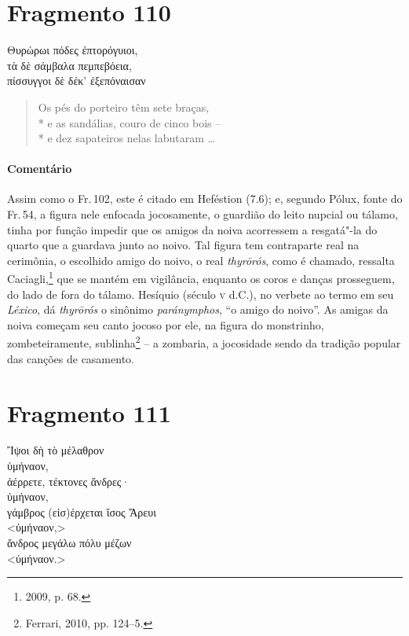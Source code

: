 {\section{Fragmento 110}

\begin{gkverse}
Θυρώρωι πόδες ἐπτορόγυιοι,\\
τὰ δὲ σάμβαλα πεμπεβόεια,\\
πίσσυγγοι δὲ δέκ’ ἐξεπόναισαν
\end{gkverse}

\begin{verse}
Os pés do porteiro têm sete braças,\\*
e as sandálias, couro de cinco bois -- \\*
e dez sapateiros nelas labutaram \ldots{}
\end{verse}

\medskip

{\paragraph{Comentário} Assim como o Fr.\,102, este é citado em Heféstion (7.6); e, segundo Pólux, fonte do Fr.\,54, a figura nele enfocada jocosamente, o guardião do leito nupcial ou tálamo, 
tinha por função impedir que os amigos da noiva acorressem a resgatá"-la do
quarto que a guardava junto ao noivo.
Tal figura tem contraparte real na cerimônia, o escolhido amigo do noivo, o real \textit{thyrōrós}, como é chamado, ressalta Caciagli,\footnote{2009, p. 68.} que se mantém em vigilância, enquanto os coros e danças prosseguem, do lado de fora do tálamo. Hesíquio (século \textsc{v} d.C.), no verbete ao termo em seu \textit{Léxico}, dá \textit{thyrōrós} o sinônimo \textit{paránymphos}, ``o amigo do noivo''. As amigas da noiva começam seu canto jocoso por ele, na figura do monstrinho, zombeteiramente, sublinha\footnote{Ferrari, 2010, pp. 124--5.} -- a zombaria, a jocosidade sendo da tradição popular das canções de casamento.}


\section{Fragmento 111}

\begin{gkverse}
Ἴψοι δὴ τὸ μέλαθρον\\
ὐμήναον,\\
ἀέρρετε, τέκτονες ἄνδρες·\\
ὐμήναον,\\
γάμβρος \dagger{}(εἰσ)έρχεται ἴσος Ἄρευι\dagger{}\\
<ὐμήναον,>\\
ἄνδρος μεγάλω πόλυ μέζων\\
<ὐμήναον.>
\end{gkverse}

}
